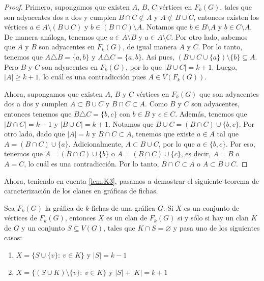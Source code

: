 \begin{proof}
    Primero, supongamos que existen $A$, $B$, $C$ v\'ertices en $F_k(G)$, tales
    que son adyacentes dos a dos y cumplen $B \cap C \not\subset A$ y $A
    \not\subset B \cup C$, entonces existen los v\'ertices  $a \in A \setminus
    (B \cup C)$ y $b \in (B \cap C)\setminus A$. Notamos que $b \in B \setminus
    A$ y $b \in C \setminus A$. De manera an\'aloga, tenemos que $a \in A
    \setminus B$ y $a \in A \setminus C$. Por otro lado, sabemos que $A$ y $B$
    son adyacentes en $F_k(G)$, de igual manera $A$ y $C$. Por lo tanto, tenemos
    que $A \triangle B = \{a,b\}$ y $A \triangle C = \{a, b\}$. As\'i pues, $(B
    \cup C \cup \{a\})\setminus \{b\} \subseteq A$. Pero $B$ y $C$ son
    adyacentes en $F_k(G)$, por lo que $|B \cup C| = k+1$. Luego, $|A| \geq
    k+1$, lo cu\'al es una contradicci\'on pues $A \in V (F_k(G))$. 

    Ahora, supongamos que existen $A$, $B$ y $C$ v\'ertices en $F_k(G)$ que son
    adyacentes dos a dos y cumplen $A \subset B \cup C$ y $B \cap C \subset A$.
    Como $B$ y $C$ son adyacentes, entonces tenemos que $B \triangle C =
    \{b,c\}$ con $b \in B$ y $c \in C$. Adem\'as, tenemos que $|B \cap C| = k-1$
    y $|B \cup C| = k +1$. Notamos que $B \cup C = (B\cap C) \cup \{b,c\}$. Por
    otro lado, dado que $|A|=k$ y $B \cap C \subset A$, tenemos que existe $a
    \in A$ tal que $A = (B \cap C) \cup \{a\}$. Adicionalmente, $A \subset B
    \cup C$, por lo que $a \in \{b, c\}$. Por eso, tenemos que $A = (B \cap C)
    \cup \{b\}$ o $A = (B \cap C) \cup \{c\}$, es decir, $A = B$ o $A=C$, lo
    cu\'al es una contradicci\'on. Por lo tanto, $B \cap C \subset A$ o $A
    \subset B \cup C$.
\end{proof}

Ahora, teniendo en cuenta \cref{lem:K3}, pasamos a demostrar el siguiente
teorema de caracterizaci\'on de los clanes en gr\'aficas de fichas.

\begin{teorema}
\label{teo:clanG-clanFG}
    Sea $F_k(G)$ la gr\'afica de $k$-fichas de una gr\'afica $G$. Si $X$ es un
    conjunto de v\'ertices de $F_k(G)$, entonces $X$ es un clan de $F_k(G)$ si y
    s\'olo si hay un clan $K$ de $G$ y un conjunto $S \subseteq V(G)$, tales que
    $K \cap S = \varnothing$ y pasa uno de los siguientes casos:
        \begin{enumerate}
            \item $X = \{S \cup \{v\}\colon\ v \in K\}$ y $|S| = k-1$
            \item $X = \{(S\cup K) \setminus \{v\}\colon\ v \in K \}$ y $|S| +
            |K| = k+1$
        \end{enumerate}
\end{teorema}

